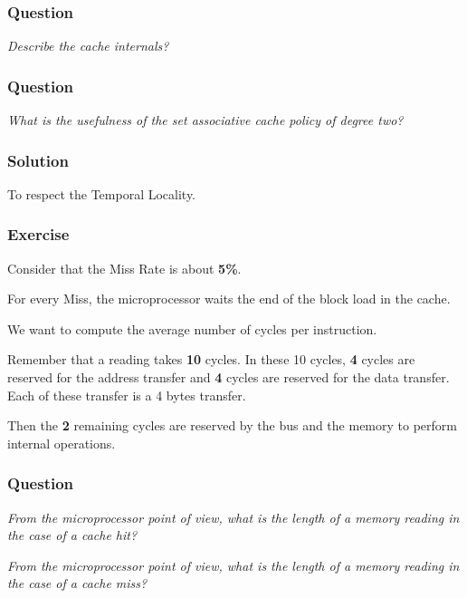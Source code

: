 
\begin{frame}
  \frametitle{Question}

  \textit{Describe the cache internals?}
\end{frame}


\begin{frame}
  \frametitle{Question}

  \textit{What is the usefulness of the set associative cache policy
    of degree two?}
\end{frame}


\begin{frame}
  \frametitle{Solution}

  To respect the Temporal Locality.
\end{frame}


\begin{frame}
  \frametitle{Exercise}

  Consider that the Miss Rate is about \textbf{5\%}.

  \-

  For every Miss, the microprocessor waits the end of the block
  load in the cache.

  \-

  We want to compute the average number of cycles per instruction.

  \-

  Remember that a reading takes \textbf{10} cycles. In these 10 cycles,
  \textbf{4} cycles are reserved for the address transfer and \textbf{4}
  cycles are reserved for the data transfer. Each of these transfer is
  a 4 bytes transfer.

  \-

  Then the \textbf{2} remaining cycles are reserved by the bus and the memory
  to perform internal operations.
\end{frame}


\begin{frame}
  \frametitle{Question}

  \textit{From the microprocessor point of view, what is the length of
    a memory reading in the case of a cache hit?}

  \-

  \textit{From the microprocessor point of view, what is the length of
    a memory reading in the case of a cache miss?}
\end{frame}

